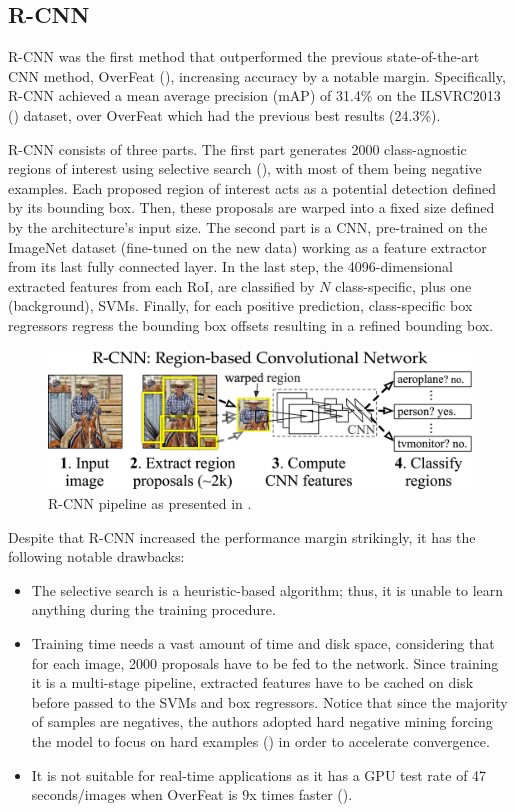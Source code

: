 \subsection{R-CNN}
R-CNN was the first method that outperformed the previous state-of-the-art CNN method, OverFeat (\cite{sermanet2013overfeat}), increasing accuracy by a notable margin. Specifically, R-CNN achieved a mean average precision (mAP) of 31.4\% on the ILSVRC2013 (\cite{deng2009imagenet}) dataset, over OverFeat which had the previous best results (24.3\%).

R-CNN consists of three parts. The first part generates 2000 class-agnostic regions of interest using selective search (\cite{uijlings2013selective}), with most of them being negative examples. Each proposed region of interest acts as a potential detection defined by its bounding box. Then, these proposals are warped into a fixed size defined by the architecture's input size. 
The second part is a CNN, pre-trained on the ImageNet dataset (fine-tuned on the new data) working as a feature extractor from its last fully connected layer. In the last step, the 4096-dimensional extracted features from each RoI, are classified by $N$ class-specific, plus one (background), SVMs. Finally, for each positive prediction, class-specific box regressors regress the bounding box offsets resulting in a refined bounding box.

\begin{figure}[!htb]
  \centering
  \includegraphics[width=12cm]{figures/ch2/fig2.png}
  \caption{R-CNN pipeline as presented in \cite{girshick2014rich}.}
  \label{ch2:fig2}
\end{figure}

Despite that R-CNN increased the performance margin strikingly, it has the following notable drawbacks:

\begin{itemize}
  \item The selective search is a heuristic-based algorithm; thus, it is unable to learn anything during the training procedure. 
  \item Training time needs a vast amount of time and disk space, considering that for each image, 2000 proposals have to be fed to the network. Since training it is a multi-stage pipeline, extracted features have to be cached on disk before passed to the SVMs and box regressors. Notice that since the majority of samples are negatives, the authors adopted hard negative mining forcing the model to focus on hard examples (\cite{felzenszwalb2009object}) in order to accelerate convergence.
  \item It is not suitable for real-time applications as it has a GPU test rate of  47 seconds/images when OverFeat is 9x times faster (\cite{girshick2015fast}). 
\end{itemize}

